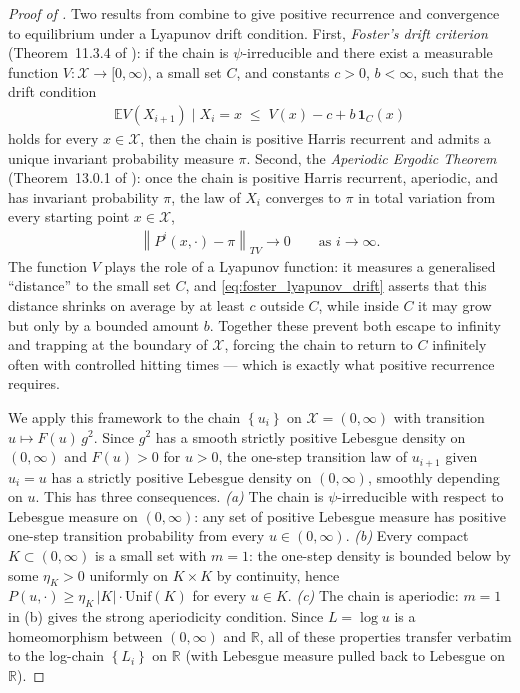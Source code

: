 \documentclass[10pt,a4paper]{amsart}
\newcommand{\Exp}[1]{\mathbb{E} #1}
\newcommand{\RR}{\mathbb{R}}
\newcommand{\Set}[1]{\left\{ #1 \right\}}
\newcommand{\cond}{\mid}
\newcommand{\mcX}{\mathcal{X}}
\newcommand{\norm}[1]{\left\|#1\right\|}
\begin{document}
\begin{proof}[Proof of ]
  Two results from \cite{meyn1993markov} combine to give positive recurrence and convergence to equilibrium under a Lyapunov drift condition. First, \emph{Foster's drift criterion} (Theorem~11.3.4 of \cite{meyn1993markov}): if the chain is $\psi$-irreducible and there exist a measurable function $V : \mcX \to [0, \infty)$, a small set $C$, and constants $c > 0$, $b < \infty$, such that the drift condition
  \begin{eqnarray}
    \label{eq:foster_lyapunov_drift}
    \Exp{V(X_{i+1}) \cond X_i = x} \;\le\; V(x) - c + b\,\mathbf{1}_C(x)
  \end{eqnarray}
  holds for every $x \in \mcX$, then the chain is positive Harris recurrent and admits a unique invariant probability measure $\pi$. Second, the \emph{Aperiodic Ergodic Theorem} (Theorem~13.0.1 of \cite{meyn1993markov}): once the chain is positive Harris recurrent, aperiodic, and has invariant probability $\pi$, the law of $X_i$ converges to $\pi$ in total variation from every starting point $x \in \mcX$,
  \begin{eqnarray*}
    \norm{P^i(x, \cdot) - \pi}_{TV} \to 0 \qquad \text{as } i \to \infty.
  \end{eqnarray*}
  The function $V$ plays the role of a Lyapunov function: it measures a generalised ``distance'' to the small set $C$, and \eqref{eq:foster_lyapunov_drift} asserts that this distance shrinks on average by at least $c$ outside $C$, while inside $C$ it may grow but only by a bounded amount $b$. Together these prevent both escape to infinity and trapping at the boundary of $\mcX$, forcing the chain to return to $C$ infinitely often with controlled hitting times --- which is exactly what positive recurrence requires.

  We apply this framework to the chain $\Set{u_i}$ on $\mcX = (0, \infty)$ with transition $u \mapsto F(u)\,g^2$. Since $g^2$ has a smooth strictly positive Lebesgue density on $(0,\infty)$ and $F(u) > 0$ for $u > 0$, the one-step transition law of $u_{i+1}$ given $u_i = u$ has a strictly positive Lebesgue density on $(0,\infty)$, smoothly depending on $u$. This has three consequences. \emph{(a)} The chain is $\psi$-irreducible with respect to Lebesgue measure on $(0, \infty)$: any set of positive Lebesgue measure has positive one-step transition probability from every $u \in (0,\infty)$. \emph{(b)} Every compact $K \subset (0,\infty)$ is a small set with $m = 1$: the one-step density is bounded below by some $\eta_K > 0$ uniformly on $K \times K$ by continuity, hence $P(u, \cdot) \ge \eta_K\,|K|\cdot \mathrm{Unif}(K)$ for every $u \in K$. \emph{(c)} The chain is aperiodic: $m = 1$ in (b) gives the strong aperiodicity condition. Since $L = \log u$ is a homeomorphism between $(0,\infty)$ and $\RR$, all of these properties transfer verbatim to the log-chain $\Set{L_i}$ on $\RR$ (with Lebesgue measure pulled back to Lebesgue on $\RR$).


\end{proof}
\end{document}

